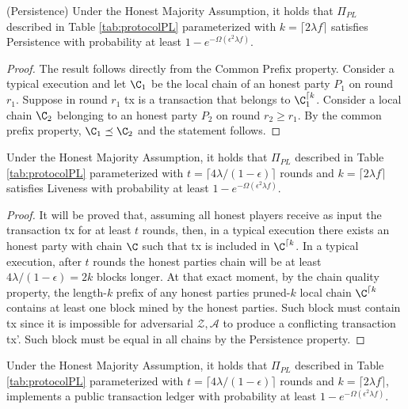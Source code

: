 \documentclass[..]{subfiles}
\begin{document}
\begin{lemma}(Persistence)
	Under the Honest Majority Assumption, it holds that $\Pi_{PL}$ described in Table \ref{tab:protocolPL} parameterized with $k = \lceil 2\lambda f \rceil$ satisfies Persistence with probability at least $1 - e^{-\Omega(\epsilon^2 \lambda f)}$.
\end{lemma}
\begin{proof}
	The result follows directly from the Common Prefix property. Consider a typical execution and let $\C_1$ be the local chain of an honest party $P_1$ on round $r_1$. Suppose in round $r_1$ tx is a transaction that belongs to $\C_1^{\lceil k}$. Consider a local chain $\C_2$ belonging to an honest party $P_2$ on round $r_2 \ge r_1$. By the common prefix property, $\C_1 \preceq \C_2$ and the statement follows.
\end{proof}


\begin{lemma}[Liveness]
	Under the Honest Majority Assumption, it holds that $\Pi_{PL}$ described in Table \ref{tab:protocolPL} parameterized with $t = \lceil 4\lambda/(1-\epsilon) \rceil$ rounds and $k = \lceil 2\lambda f \rceil$ satisfies Liveness with probability at least $1 - e^{-\Omega(\epsilon^2 \lambda f)}$.
\end{lemma}
\begin{proof}
	It will be proved that, assuming all honest players receive as input the transaction tx for at least $t$ rounds, then, in a typical execution there exists an honest party with chain $\C$ such that tx is included in $\C^{\lceil k}$. In a typical execution, after $t$ rounds the honest parties chain will be at least $4\lambda / (1-\epsilon) = 2k$ blocks longer. At that exact moment, by the chain quality property, the length-$k$ prefix of any honest parties pruned-$k$ local chain $\C^{\lceil k}$ contains at least one block mined by the honest parties. Such block must contain tx since it is impossible for adversarial $\mathcal{Z}, \mathcal{A}$ to produce a conflicting transaction tx'. Such block must be equal in all chains by the Persistence property.
\end{proof}


\begin{theorem}
	Under the Honest Majority Assumption, it holds that $\Pi_{PL}$ described in Table \ref{tab:protocolPL} parameterized with $t = \lceil 4\lambda/(1-\epsilon) \rceil$ rounds and $k = \lceil 2\lambda f \rceil$, implements a public transaction ledger with probability at least $1 - e^{-\Omega(\epsilon^2 \lambda f)}$.
\end{theorem}
\end{document}
